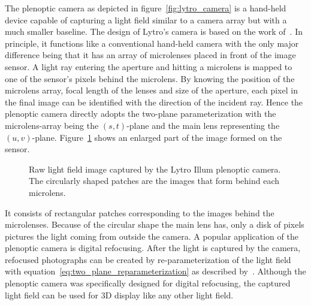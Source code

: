 The plenoptic camera as depicted in figure~\ref{fig:lytro_camera} is a hand-held device capable of capturing a light field similar to a camera array but with a much smaller baseline.
The design of Lytro's camera is based on the work of~\cite{LightFieldPhotographyHandHeldPlenopticCamera}.
In principle, it functions like a conventional hand-held camera with the only major difference being that it has an array of microlenses placed in front of the image sensor.
A light ray entering the aperture and hitting a microlens is mapped to one of the sensor's pixels behind the microlens.
By knowing the position of the microlens array, focal length of the lenses and size of the aperture, each pixel in the final image can be identified with the direction of the incident ray. 
Hence the plenoptic camera directly adopts the two-plane parameterization with the microlens-array being the \mbox{$(s, t)$-plane} and the main lens representing the \mbox{$(u, v)$-plane}.
Figure~\ref{fig:lytro_lenslet_array_zoom} shows an enlarged part of the image formed on the sensor.
\begin{figure}[tb]
	\centering
	
	\caption[Light field image captured with a plenoptic camera]
			{Raw light field image captured by the Lytro Illum plenoptic camera. 
			 The circularly shaped patches are the images that form behind each microlens.}
	\label{fig:lytro_lenslet_array_zoom}
\end{figure}
It consists of rectangular patches corresponding to the images behind the microlenses.
Because of the circular shape the main lens has, only a disk of pixels pictures the light coming from outside the camera.
A popular application of the plenoptic camera is digital refocusing.
After the light is captured by the camera, refocused photographs can be created by re-parameterization of the light field with equation~\ref{eq:two_plane_reparameterization} as described by~\cite{LightFieldPhotographyHandHeldPlenopticCamera}.
Although the plenoptic camera was specifically designed for digital refocusing, the captured light field can be used for 3D display like any other light field.